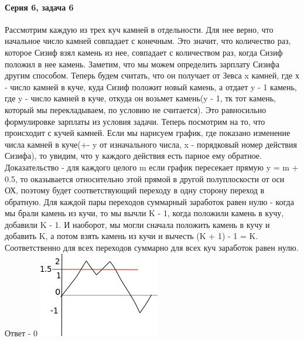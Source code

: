 \documentclass{article}
\begin{document}
	\paragraph{Серия 6, задача 6}
	\hspace{\fill}
	\newline	
	Рассмотрим каждую из трех куч камней в отдельности. Для нее верно, что начальное число камней совпадает с конечным. Это значит, что количество раз, которое Сизиф взял камень из нее, совпадает с количеством раз, когда Сизиф положил в нее камень. 
	\newline
	Заметим, что мы можем определить зарплату Сизифа другим способом. Теперь будем считать, что он получает от Зевса x камней, где х - число камней в куче, куда Сизиф положит новый камень, а отдает y - 1  камень, где y - число камней в куче, откуда он возьмет камень(y - 1, тк тот камень, который мы перекладываем, по условию не считается). Это равносильно формулировке зарплаты из условия задачи.
	\newline
	Теперь посмотрим на то, что происходит с кучей камней. Если мы нарисуем график, где показано изменение числа камней в куче(+- y от изначального числа, x - порядковый номер действия Сизифа), то увидим, что у каждого действия есть парное ему обратное. Доказательство - для каждого целого m если график пересекает прямую y = m + 0.5, то оказывается относительно этой прямой в другой полуплоскости от оси ОХ, поэтому будет соответствующий переходу в одну сторону переход в обратную. Для каждой пары переходов суммарный заработок равен нулю - когда мы брали камень из кучи, то мы вычли K - 1, когда положили камень в кучу, добавили K - 1. И наоборот, мы могли сначала положить камень в кучу и добавить K, а потом взять камень из кучи и вычесть (K + 1) - 1 = K. Соответственно для всех переходов суммарно для всех куч заработок равен нулю.
	\newline
	Ответ - 0
	\newline
	\includegraphics[]{count_2.png}
\end{document}
